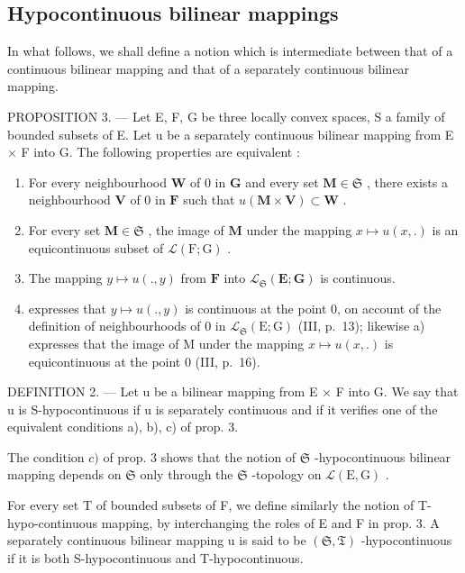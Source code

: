 \subsection{Hypocontinuous bilinear mappings}

In what follows, we shall define a notion which is intermediate between that of a continuous bilinear mapping and that of a separately continuous bilinear mapping.

PROPOSITION 3. --- Let E, F, G be three locally convex spaces, S a family of bounded subsets of E. Let u be a separately continuous bilinear mapping from E × F into G. The following properties are equivalent :

\begin{enumerate}
\def\labelenumi{\alph{enumi})}
\item
  For every neighbourhood \(\mathbf{W}\) of 0 in \(\mathbf{G}\) and every set \(\mathbf{M} \in \mathfrak{S}\) , there exists a neighbourhood \(\mathbf{V}\) of 0 in \(\mathbf{F}\) such that \(u(\mathbf{M} \times \mathbf{V}) \subset \mathbf{W}\) .
\item
  For every set \(\mathbf{M} \in \mathfrak{S}\) , the image of \(\mathbf{M}\) under the mapping \(x \mapsto u(x, .)\) is an equicontinuous subset of \(\mathcal{L}(\mathrm{F}; \mathrm{G})\) .
\item
  The mapping \(y \mapsto u(., y)\) from \(\mathbf{F}\) into \(\mathcal{L}_{\mathfrak{S}}(\mathbf{E}; \mathbf{G})\) is continuous.
\item
  expresses that \(y \mapsto u(., y)\) is continuous at the point 0, on account of the definition of neighbourhoods of 0 in \(\mathcal{L}_{\mathfrak{S}}(\mathrm{E}; \mathrm{G})\) (III, p.~13); likewise a) expresses that the image of M under the mapping \(x \mapsto u(x, .)\) is equicontinuous at the point 0 (III, p.~16).
\end{enumerate}

DEFINITION 2. --- Let u be a bilinear mapping from E × F into G. We say that u is S-hypocontinuous if u is separately continuous and if it verifies one of the equivalent conditions a), b), c) of prop. 3.

The condition \(c)\) of prop. 3 shows that the notion of \(\mathfrak{S}\) -hypocontinuous bilinear mapping depends on \(\mathfrak{S}\) only through the \(\mathfrak{S}\) -topology on \(\mathcal{L}(\mathrm{E},\mathrm{G})\) .

For every set T of bounded subsets of F, we define similarly the notion of T-hypo-continuous mapping, by interchanging the roles of E and F in prop. 3. A separately continuous bilinear mapping u is said to be \((\mathfrak{S}, \mathfrak{T})\) -hypocontinuous if it is both S-hypocontinuous and T-hypocontinuous.

